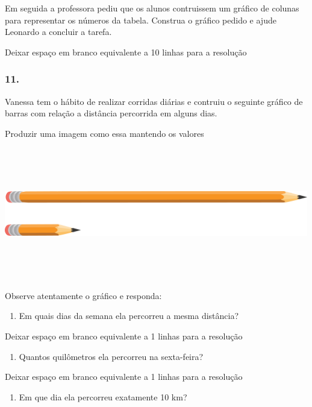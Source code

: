 Em seguida a professora pediu que os alunos contruissem um gráfico de
colunas para representar os números da tabela. Construa o gráfico pedido
e ajude Leonardo a concluir a tarefa.

Deixar espaço em branco equivalente a 10 linhas para a resolução

\subsubsection{11.}\label{section-117}

Vanessa tem o hábito de realizar corridas diárias e contruiu o seguinte
gráfico de barras com relação a distância percorrida em alguns dias.

Produzir uma imagem como essa mantendo os valores

\includegraphics[width=5.22545in,height=2.25853in]{media/image101.png}

Observe atentamente o gráfico e responda:

\begin{enumerate}
\def\labelenumi{\alph{enumi})}
\item
  Em quais dias da semana ela percorreu a mesma distância?
\end{enumerate}

Deixar espaço em branco equivalente a 1 linhas para a resolução

\begin{enumerate}
\def\labelenumi{\alph{enumi})}
\item
  Quantos quilômetros ela percorreu na sexta-feira?
\end{enumerate}

Deixar espaço em branco equivalente a 1 linhas para a resolução

\begin{enumerate}
\def\labelenumi{\alph{enumi})}
\item
  Em que dia ela percorreu exatamente 10 km?
\end{enumerate}

